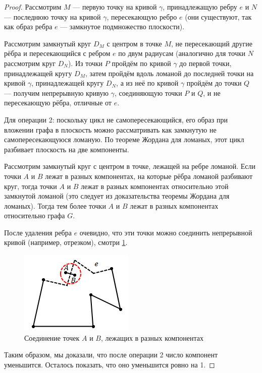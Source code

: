\begin{proof}
    Рассмотрим $M$ — первую точку на кривой $\gamma$, принадлежащую ребру $e$ и $N$ — последнюю точку на кривой $\gamma$, пересекающую ребро $e$ (они существуют, так как образ ребра $e$ — замкнутое подмножество плоскости).

    Рассмотрим замкнутый круг $D_M$ с центром в точке $M$, не пересекающий другие рёбра и пересекающийся с ребром $e$ по двум радиусам (аналогично для точки $N$ рассмотрим круг $D_N$). Из точки $P$ пройдём по кривой $\gamma$ до первой точки, принадлежащей кругу $D_M$, затем пройдём вдоль ломаной до последней точки на кривой $\gamma$, принадлежащей кругу $D_N$, а из неё по кривой $\gamma$ пройдём до точки $Q$ — получим непрерывную кривую $\gamma$, соединяющую точки $P$ и $Q$, и не пересекающую рёбра, отличные от $e$.

    Для операции 2: поскольку цикл не самопересекающийся, его образ при вложении графа в плоскость можно рассматривать как замкнутую не самопересекающуюся ломаную. По теореме Жордана для ломаных, этот цикл разбивает плоскость на две компоненты.

    Рассмотрим замкнутый круг с центром в точке, лежащей на ребре ломаной. Если точки $A$ и $B$ лежат в разных компонентах, на которые рёбра ломаной разбивают круг, тогда точки $A$ и $B$ лежат в разных компонентах относительно этой замкнутой ломаной (это следует из доказательства теоремы Жордана для ломаных). Тогда тем более точки $A$ и $B$ лежат в разных компонентах относительно графа $G$.

    После удаления ребра $e$ очевидно, что эти точки можно соединить непрерывной кривой (например, отрезком), смотри \ref{fig:c6.2}.

    \begin{figure}[h]
        \centering
        \includegraphics[scale=0.8]{images/c6.2.png}
        \caption{Соединение точек $A$ и $B$, лежащих в разных компонентах}
        \label{fig:c6.2}
    \end{figure}

    Таким образом, мы доказали, что после операции 2 число компонент уменьшится. Осталось показать, что оно уменьшится ровно на 1.


\end{proof}
